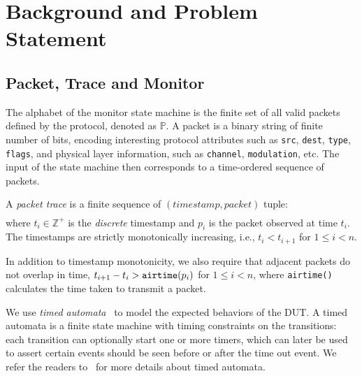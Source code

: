 \section{Background and Problem Statement}
\label{sec:background}

\subsection{Packet, Trace and Monitor}
\label{subsec:basic}

The alphabet of the monitor state machine is the finite set of all valid packets
defined by the protocol, denoted as $\mathbb{P}$.  A packet is a binary string
of finite number of bits, encoding interesting protocol attributes such as
\texttt{src}, \texttt{dest}, \texttt{type}, \texttt{flags}, and physical layer
information, such as \texttt{channel}, \texttt{modulation}, etc. The input of
the state machine then corresponds to a time-ordered sequence of packets.

\begin{definition}
  A \textit{packet trace} is a finite sequence of $(timestamp, packet)$ tuple:
  \begin{align*}
    [(t_1, p_1), (t_2, p_2),\ldots,(t_n, p_n)]
  \end{align*}%
  where $t_i \in \mathbb{Z}^+$ is the \textit{discrete} timestamp and $p_i$ is the packet
  observed at time $t_i$. The timestamps are strictly monotonically increasing,
  i.e., $t_i < t_{i+1}$ for $1 \le i < n$.
\end{definition}%

In addition to timestamp monotonicity, we also require that adjacent packets do
not overlap in time, $t_{i+1}-t_i > \text{\texttt{airtime}}(p_i)$ for $1 \le i
< n$, where \texttt{airtime()} calculates the time taken to transmit a packet.

We use \textit{timed automata}~\cite{alur1994theory} to model the expected
behaviors of the DUT.  A timed automata is a finite state machine with timing
constraints on the transitions: each transition can optionally start one or more
timers, which can later be used to assert certain events should be seen before
or after the time out event. We refer the readers to~\cite{alur1994theory} for
more details about timed automata.


